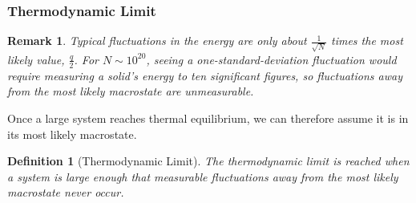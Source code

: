\documentclass{article}
\newtheorem{definition}{Definition}
\newtheorem{remark}{Remark}
\begin{document}
\subsubsection{Thermodynamic Limit}
\begin{remark}
    Typical fluctuations in the energy are only about $\frac{1}{\sqrt{N}}$ times the most likely value, $\frac{q}{2}$. For $N \sim 10^{20}$, seeing a one-standard-deviation fluctuation would require measuring a solid's energy to ten significant figures, so fluctuations away from the most likely macrostate are unmeasurable.
\end{remark}
Once a large system reaches thermal equilibrium, we can therefore assume it is in its most likely macrostate.
\begin{definition}[Thermodynamic Limit]
    The thermodynamic limit is reached when a system is large enough that measurable fluctuations away from the most likely macrostate never occur.
\end{definition}
\end{document}
